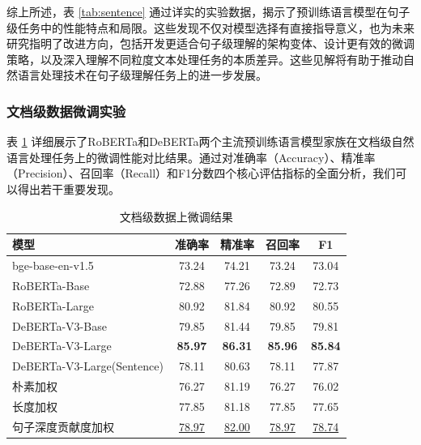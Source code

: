 综上所述，表 \ref{tab:sentence} 通过详实的实验数据，揭示了预训练语言模型在句子级任务中的性能特点和局限。这些发现不仅对模型选择有直接指导意义，也为未来研究指明了改进方向，包括开发更适合句子级理解的架构变体、设计更有效的微调策略，以及深入理解不同粒度文本处理任务的本质差异。这些见解将有助于推动自然语言处理技术在句子级理解任务上的进一步发展。

\subsubsection{文档级数据微调实验}

表 \ref{tab:document} 详细展示了RoBERTa和DeBERTa两个主流预训练语言模型家族在文档级自然语言处理任务上的微调性能对比结果。通过对准确率（Accuracy）、精准率（Precision）、召回率（Recall）和F1分数四个核心评估指标的全面分析，我们可以得出若干重要发现。

\begin{table}[htbp]
\caption{文档级数据上微调结果}
\centering
\begin{tabular}{l|cccc}
\toprule
\textbf{模型}& \textbf{准确率}   & \textbf{精准率}    & \textbf{召回率}    & \textbf{F1}   \\ \midrule
bge-base-en-v1.5 \cite{bge_embedding} & 73.24          & 74.21          & 73.24          & 73.04          \\
RoBERTa-Base \cite{liu_roberta_2019}  & 72.88          & 77.26          & 72.89          & 72.73          \\
RoBERTa-Large \cite{liu_roberta_2019} & 80.92          & 81.84          & 80.92          & 80.55          \\
DeBERTa-V3-Base \cite{he2023debertav3improvingdebertausing} & 79.85          & 81.44          & 79.85          & 79.81          \\
DeBERTa-V3-Large \cite{he2023debertav3improvingdebertausing} & \textbf{85.97} & \textbf{86.31} & \textbf{85.96} & \textbf{85.84} \\ \midrule
DeBERTa-V3-Large\cite{he2023debertav3improvingdebertausing}(Sentence)  & 78.11 & 80.63 & 78.11 & 77.87 \\
朴素加权 & 76.27 & 81.19 & 76.27 & 76.02 \\
长度加权 & 77.85 & 81.18 & 77.85 & 77.65 \\
句子深度贡献度加权 & \uline{78.97} & \uline{82.00} & \uline{78.97} & \uline{78.74} \\ \bottomrule
\end{tabular}
\label{tab:document}
\end{table}

